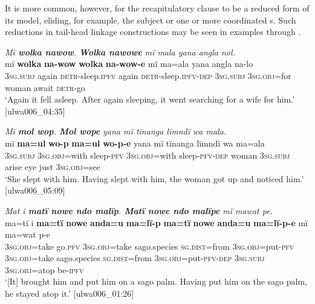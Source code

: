 It is more common, however, for the recapitulatory clause to be a reduced form of its model, eliding, for example, the subject or one or more coordinated s. Such reductions in tail-head linkage constructions may be seen in examples  through .

\ea%
    \label{ex:complex:66}
          \textit{Mï \textbf{wolka nawow}. \textbf{Wolka nawowe} mï mala yana angla nol.}\\
\gll    mï      \textbf{wolka}  \textbf{na-wow}      \textbf{wolka}  \textbf{na-wow{}-e}     mï      ma=ala    yana  angla  na-lo\\
    \textsc{3sg.subj}  again  \textsc{detr-}sleep.\textsc{ipfv}  again  \textsc{detr-}sleep.\textsc{ipfv{}-dep}    \textsc{3sg.subj}  \textsc{3sg.obj=}for  woman  await  \textsc{detr}{}-go\\
\glt `Again it fell asleep. After again sleeping, it went searching for a wife for him.’ [ulwa006\_04:35]
\z

\ea%
    \label{ex:complex:67}
          \textit{Mï \textbf{mol wop}. \textbf{Mol wope} yana mï tïnanga lïmndï wa mala.}\\
\gll    mï      \textbf{ma=ul}      \textbf{wo-p}    \textbf{ma=ul}      \textbf{wo-p-e}     yana    mï      tïnanga  lïmndï  wa  ma=ala\\
    3\textsc{sg.subj}  3\textsc{sg.obj}=with  sleep-\textsc{pfv}  \textsc{3sg.obj=}with  sleep\textsc{{}-pfv-dep}    woman    \textsc{3sg.subj}  arise  eye    just  3\textsc{sg.obj}=see\\
\glt `She slept with him. Having slept with him, the woman got up and noticed him.’ [ulwa006\_05:09]
\z

\ea%
    \label{ex:complex:68}
          \textit{Mat i \textbf{matï nowe ndo malïp}. \textbf{Matï nowe ndo malïpe} mï mawat pe.}\\
\gll    ma=tï      i    \textbf{ma=tï}      \textbf{nowe}    \textbf{anda=u}     \textbf{ma=lï-p}      \textbf{ma=tï}      \textbf{nowe}    \textbf{anda=u}     \textbf{ma=lï-p-e}        mï      ma=wat    p-e\\
    3\textsc{sg.obj}=take  go.\textsc{pfv}  \textsc{3sg.obj}=take  sago.species  \textsc{sg.dist}=from  3\textsc{sg.obj}=put-\textsc{pfv}  3\textsc{sg.obj}=take  sago.species  \textsc{sg.dist}=from    3\textsc{sg.obj}=put-\textsc{pfv-dep}  3\textsc{sg.subj}  3\textsc{sg.obj}=atop  be\textsc{{}-ipfv}\\
\glt `[It] brought him and put him on a sago palm. Having put him on the sago palm, he stayed atop it.’ [ulwa006\_01:26]
\z

